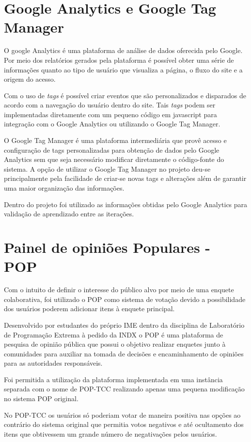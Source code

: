 \section{Google Analytics e Google Tag Manager}
\par O google Analytics é uma plataforma de análise de dados oferecida pelo Google. Por meio dos relatórios gerados pela plataforma é possível obter uma série de informações quanto ao tipo de usuário que visualiza a página, o fluxo do site e a origem do acesso.
\par Com o uso de \emph{tags} é possível criar eventos que são personalizados e disparados de acordo com a navegação do usuário dentro do site. Tais \emph{tags} podem ser implementadas diretamente com um pequeno código em javascript para integração com o Google Analytics ou utilizando o Google Tag Manager.
\par O Google Tag Manager é uma plataforma intermediária que provê acesso e configuração de tags personalizadas para obtenção de dados pelo Google Analytics sem que seja necessário modificar diretamente o código-fonte do sistema. A opção de utilizar o Google Tag Manager no projeto deu-se principalmente pela facilidade de criar-se novas tags e alterações além de garantir uma maior organização das informações.
\par Dentro do projeto foi utilizado as informações obtidas pelo Google Analytics para validação de aprendizado entre as iterações.

\section{Painel de opiniões Populares - POP}
\par Com o intuito de definir o interesse do público alvo por meio de uma enquete colaborativa, foi utilizado o POP como sistema de votação devido a possibilidade dos usuários poderem adicionar itens à enquete principal.
\par Desenvolvido por estudantes do próprio IME dentro da disciplina de Laboratório de Programação Extrema à pedido da INDX o POP é uma plataforma de pesquisa de opinião pública que possui o objetivo realizar enquetes junto à comunidades para auxiliar na tomada de decisões e encaminhamento de opiniões para as autoridades responsáveis.
\par Foi permitida a utilização da plataforma implementada em uma instância separada com o nome de POP-TCC realizando apenas uma pequena modificação no sistema POP original.
\par No POP-TCC os usuários só poderiam votar de maneira positiva nas opções ao contrário do sistema original que permitia votos negativos e até ocultamento dos itens que obtivessem um grande número de negativações pelos usuários.

